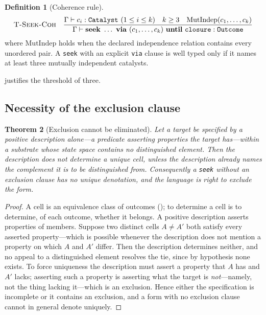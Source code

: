 \documentclass[11pt,a4paper]{article}
\theoremstyle{thmstyle}
\newtheorem{theorem}{Theorem}[section]
\theoremstyle{definition}
\newtheorem{definition}[theorem]{Definition}
\theoremstyle{remark}
\newcommand{\Env}{\Gamma}
\newcommand{\seek}{\mathbf{seek}}
\newcommand{\via}{\mathbf{via}}
\newcommand{\until}{\mathbf{until}}
\begin{document}
\begin{definition}[Coherence rule]
\label{def:coherence-rule}
\[
\textsc{T-Seek-Coh}\quad
\frac{\Env\vdash c_i:\texttt{Catalyst}\ (1\le i\le k)\quad
      k\ge3\quad \mathrm{MutIndep}(c_1,\dots,c_k)}
     {\Env\vdash \seek\ \dots\ \via\ (c_1,\dots,c_k)\ \until\ \texttt{closure}:\texttt{Outcome}}
\]
where $\mathrm{MutIndep}$ holds when the declared independence relation
contains every unordered pair. A \texttt{seek} with an explicit \texttt{via}
clause is well typed only if it names at least three mutually independent
catalysts.
\end{definition}

 justifies the threshold of three.

\subsection{Necessity of the exclusion clause}

\begin{theorem}[Exclusion cannot be eliminated]
\label{thm:exclusion-necessary}
Let a target be specified by a positive description alone---a predicate
asserting properties the target has---within a substrate whose state space
contains no distinguished element. Then the description does not determine a
unique cell, unless the description already names the complement it is to be
distinguished from. Consequently a \texttt{seek} without an exclusion clause
has no unique denotation, and the language is right to exclude the form.
\end{theorem}

\begin{proof}
A cell is an equivalence class of outcomes (); to determine a
cell is to determine, of each outcome, whether it belongs. A positive
description asserts properties of members. Suppose two distinct cells
$A\ne A'$ both satisfy every asserted property---which is possible whenever
the description does not mention a property on which $A$ and $A'$ differ.
Then the description determines neither, and no appeal to a distinguished
element resolves the tie, since by hypothesis none exists. To force
uniqueness the description must assert a property that $A$ has and $A'$
lacks; asserting such a property is asserting what the target is
\emph{not}---namely, not the thing lacking it---which is an exclusion. Hence
either the specification is incomplete or it contains an exclusion, and a
form with no exclusion clause cannot in general denote uniquely.
\end{proof}
\end{document}
